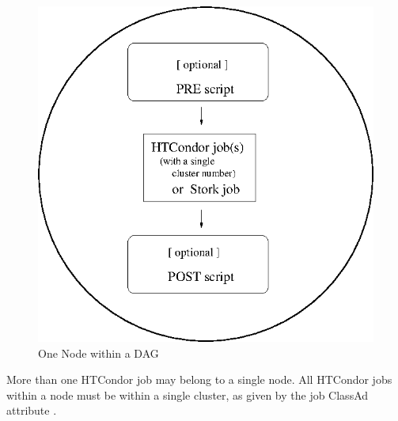 \begin{figure}[hbt]
\centering
\includegraphics{user-man/dagman-node}




\caption{\label{fig:dagman-node}One Node within a DAG}
\end{figure}

More than one HTCondor job may belong to a single node.
All HTCondor jobs within a node must be within
a single cluster, as given by the job ClassAd attribute .

